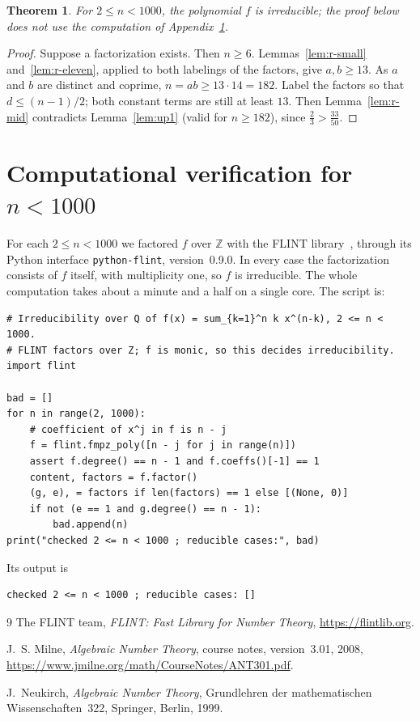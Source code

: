 \documentclass[11pt]{amsart}
\newtheorem{theorem}{Theorem}[section]
\theoremstyle{definition}
\theoremstyle{remark}
\numberwithin{equation}{section}
\newcommand{\Z}{\mathbb{Z}}
\begin{document}
\begin{theorem}\label{thm:r-all}
For $2\le n<1000$, the polynomial $f$ is irreducible; the proof below does
not use the computation of Appendix~\ref{app:computation}.
\end{theorem}

\begin{proof}
Suppose a factorization exists. Then $n\ge6$. Lemmas~\ref{lem:r-small}
and~\ref{lem:r-eleven}, applied to both labelings of the factors, give
$a,b\ge13$. As $a$ and $b$ are distinct and coprime, $n=ab\ge13\cdot14=182$.
Label the factors so that $d\le(n-1)/2$; both constant terms are still at
least $13$. Then Lemma~\ref{lem:r-mid} contradicts Lemma~\ref{lem:up1} (valid for $n\ge182$),
since $\frac23>\frac{33}{50}$.
\end{proof}

\appendix
\section{\texorpdfstring{Computational verification for $n<1000$}{Computational verification for n < 1000}}\label{app:computation}

For each $2\le n<1000$ we factored $f$ over $\Z$ with the FLINT
library~\cite{FLINT}, through its Python interface \texttt{python-flint},
version~0.9.0. In every case the factorization consists of $f$ itself, with
multiplicity one, so $f$ is irreducible. The whole computation takes about
a minute and a half on a single core. The script is:
\begin{verbatim}
# Irreducibility over Q of f(x) = sum_{k=1}^n k x^(n-k), 2 <= n < 1000.
# FLINT factors over Z; f is monic, so this decides irreducibility.
import flint

bad = []
for n in range(2, 1000):
    # coefficient of x^j in f is n - j
    f = flint.fmpz_poly([n - j for j in range(n)])
    assert f.degree() == n - 1 and f.coeffs()[-1] == 1
    content, factors = f.factor()
    (g, e), = factors if len(factors) == 1 else [(None, 0)]
    if not (e == 1 and g.degree() == n - 1):
        bad.append(n)
print("checked 2 <= n < 1000 ; reducible cases:", bad)
\end{verbatim}
Its output is
\begin{verbatim}
checked 2 <= n < 1000 ; reducible cases: []
\end{verbatim}

\begin{thebibliography}{9}
The FLINT team, \emph{FLINT: Fast Library for Number Theory},
\url{https://flintlib.org}.

J.~S. Milne, \emph{Algebraic Number Theory}, course notes, version~3.01,
2008, \url{https://www.jmilne.org/math/CourseNotes/ANT301.pdf}.

J.~Neukirch, \emph{Algebraic Number Theory}, Grundlehren der
mathematischen Wissenschaften~322, Springer, Berlin, 1999.
\end{thebibliography}
\end{document}
